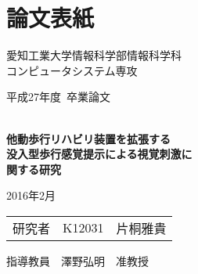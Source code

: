 \chapter{論文表紙}
\thispagestyle{myheadings}

\vspace{-1.0cm}

\begin{center}

{\LARGE 愛知工業大学情報科学部情報科学科\\
コンピュータシステム専攻

\vspace{1.0cm}

平成27年度~卒業論文\\

\vspace{2.0cm}

{\Huge 
\baselineskip=15mm
\textbf{\\他動歩行リハビリ装置を拡張する
\\没入型歩行感覚提示による視覚刺激に
\\関する研究\\}}

\vspace{7.0cm}

2016年2月\\

\vspace{1.0cm}

\begin{tabular}[h]{lll}
  研究者 & K12031 & 片桐雅貴\\
\end{tabular}

\vspace{1.0cm}

指導教員\ \ 澤野弘明\ \ 准教授}

\end{center}

